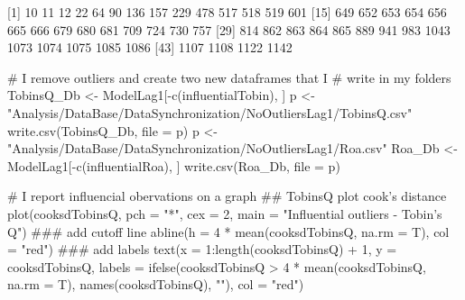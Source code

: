 \documentclass[12pt,]{article}
\newenvironment{Shaded}{}{}
\newcommand{\KeywordTok}[1]{\textcolor[rgb]{0.00,0.00,1.00}{#1}}
\newcommand{\DataTypeTok}[1]{#1}
\newcommand{\DecValTok}[1]{#1}
\newcommand{\StringTok}[1]{\textcolor[rgb]{0.00,0.50,0.50}{#1}}
\newcommand{\CommentTok}[1]{\textcolor[rgb]{0.00,0.50,0.00}{#1}}
\newcommand{\OperatorTok}[1]{#1}
\newcommand{\NormalTok}[1]{#1}
\begin{document}
{[}1{]} 10 11 12 22 64 90 136 157 229 478 517 518 519 601 {[}15{]} 649
652 653 654 656 665 666 679 680 681 709 724 730 757 {[}29{]} 814 862 863
864 865 889 941 983 1043 1073 1074 1075 1085 1086 {[}43{]} 1107 1108
1122 1142

\begin{Shaded}
\begin{Highlighting}[]
\CommentTok{# I remove outliers and create two new dataframes that I}
\CommentTok{# write in my folders}
\NormalTok{TobinsQ_Db <-}\StringTok{ }\NormalTok{ModelLag1[}\OperatorTok{-}\KeywordTok{c}\NormalTok{(influentialTobin), ]}
\NormalTok{p <-}\StringTok{ "Analysis/DataBase/DataSynchronization/NoOutliersLag1/TobinsQ.csv"}
\KeywordTok{write.csv}\NormalTok{(TobinsQ_Db, }\DataTypeTok{file =}\NormalTok{ p)}
\NormalTok{p <-}\StringTok{ "Analysis/DataBase/DataSynchronization/NoOutliersLag1/Roa.csv"}
\NormalTok{Roa_Db <-}\StringTok{ }\NormalTok{ModelLag1[}\OperatorTok{-}\KeywordTok{c}\NormalTok{(influentialRoa), ]}
\KeywordTok{write.csv}\NormalTok{(Roa_Db, }\DataTypeTok{file =}\NormalTok{ p)}
\end{Highlighting}
\end{Shaded}

\begin{Shaded}
\begin{Highlighting}[]
\CommentTok{# I report influencial obervations on a graph}
\NormalTok{## TobinsQ plot cook's distance}
\KeywordTok{plot}\NormalTok{(cooksdTobinsQ, }\DataTypeTok{pch =} \StringTok{"*"}\NormalTok{, }\DataTypeTok{cex =} \DecValTok{2}\NormalTok{, }\DataTypeTok{main =} \StringTok{"Influential outliers - Tobin's Q"}\NormalTok{)}
\NormalTok{### add cutoff line}
\KeywordTok{abline}\NormalTok{(}\DataTypeTok{h =} \DecValTok{4} \OperatorTok{*}\StringTok{ }\KeywordTok{mean}\NormalTok{(cooksdTobinsQ, }\DataTypeTok{na.rm =}\NormalTok{ T), }\DataTypeTok{col =} \StringTok{"red"}\NormalTok{)}
\NormalTok{### add labels}
\KeywordTok{text}\NormalTok{(}\DataTypeTok{x =} \DecValTok{1}\OperatorTok{:}\KeywordTok{length}\NormalTok{(cooksdTobinsQ) }\OperatorTok{+}\StringTok{ }\DecValTok{1}\NormalTok{, }\DataTypeTok{y =}\NormalTok{ cooksdTobinsQ, }
    \DataTypeTok{labels =} \KeywordTok{ifelse}\NormalTok{(cooksdTobinsQ }\OperatorTok{>}\StringTok{ }\DecValTok{4} \OperatorTok{*}\StringTok{ }\KeywordTok{mean}\NormalTok{(cooksdTobinsQ, }
        \DataTypeTok{na.rm =}\NormalTok{ T), }\KeywordTok{names}\NormalTok{(cooksdTobinsQ), }\StringTok{""}\NormalTok{), }\DataTypeTok{col =} \StringTok{"red"}\NormalTok{)}
\end{Highlighting}
\end{Shaded}
\end{document}
